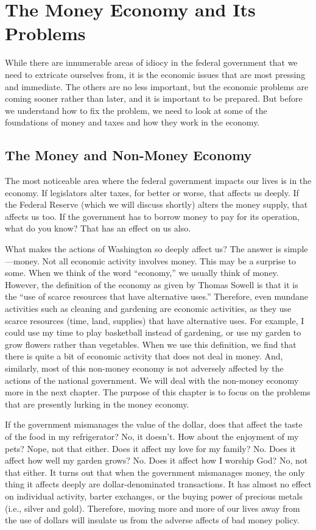 \chapter{The Money Economy and Its Problems}

While there are innumerable areas of idiocy in the federal government
that we need to extricate ourselves from, it is the economic issues
that are most pressing
and immediate. The
others are no less important, but the economic problems are coming
sooner rather than later, and it is important to be prepared.  But
before we understand how to fix the problem, we need to look at some of
the foundations of money and taxes and how they work in the economy.

\section{The Money and Non-Money Economy}

The most noticeable area where the federal government impacts our lives
is in the economy. If legislators alter taxes, for better or worse,
that affects us deeply. If the Federal Reserve (which we will discuss
shortly) alters the money supply, that affects us too. If the
government has to borrow money to pay for its operation,
what do you know? That
has an effect on us also.

What makes the actions of Washington so deeply affect us?  The answer is
simple—money.  Not all economic activity involves money. This may be a
surprise to some. When we think of the word “economy,” we usually think
of money. However, the definition of the economy as given by Thomas
Sowell is that it is the “use of scarce resources that have alternative
uses.”  Therefore, even mundane activities such as cleaning and
gardening are economic
activities, as they
use scarce resources (time, land, supplies) that have alternative uses.
For example, I could
use my time to play basketball instead of gardening, or use my garden
to grow flowers rather than vegetables. When we use this definition, we
find that there is quite a bit of economic activity that does not deal
in money. And, similarly, most of this non-money economy is not
adversely affected by the actions of the national government. We will
deal with the non-money economy more in the next chapter. The purpose
of this chapter is to focus on the problems that are presently lurking
in the money economy.

If the government mismanages the value of the dollar, does that affect
the taste of the food in my refrigerator?  No, it doesn’t. How about
the enjoyment of my pets?  Nope, not that either. Does it affect my
love for my family?  No. Does it affect how well my garden grows?  No.
Does it affect how I worship God? No, not that either. It turns out
that when the government mismanages money, the only thing it affects
deeply are dollar-denominated transactions. It has almost no effect on
individual activity, barter exchanges, or the buying power of precious
metals (i.e., silver and gold). Therefore, moving more and more of our
lives away from the use of dollars will insulate us from the adverse
affects of bad money policy.

